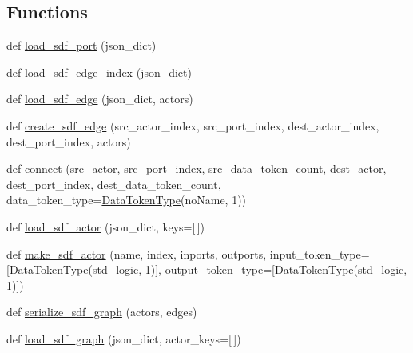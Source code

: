 \subsection*{Functions}
\begin{DoxyCompactItemize}
\item 
def \hyperlink{namespacesylva_1_1base_1_1sdf_a72bbd0e1cd0a666269ac3f17427954b8}{load\+\_\+sdf\+\_\+port} (json\+\_\+dict)
\item 
def \hyperlink{namespacesylva_1_1base_1_1sdf_a67886f481ab9be68797400241d754f64}{load\+\_\+sdf\+\_\+edge\+\_\+index} (json\+\_\+dict)
\item 
def \hyperlink{namespacesylva_1_1base_1_1sdf_acd1ba464e47476a5205de3e3856fbb83}{load\+\_\+sdf\+\_\+edge} (json\+\_\+dict, actors)
\item 
def \hyperlink{namespacesylva_1_1base_1_1sdf_a7c688b99c9dcb365aa7598c79f038839}{create\+\_\+sdf\+\_\+edge} (src\+\_\+actor\+\_\+index, src\+\_\+port\+\_\+index, dest\+\_\+actor\+\_\+index, dest\+\_\+port\+\_\+index, actors)
\item 
def \hyperlink{namespacesylva_1_1base_1_1sdf_a0c4055dfc61c95b2f23e5a5dba353302}{connect} (src\+\_\+actor, src\+\_\+port\+\_\+index, src\+\_\+data\+\_\+token\+\_\+count, dest\+\_\+actor, dest\+\_\+port\+\_\+index, dest\+\_\+data\+\_\+token\+\_\+count, data\+\_\+token\+\_\+type=\hyperlink{classsylva_1_1base_1_1sdf_1_1_data_token_type}{Data\+Token\+Type}(\textquotesingle{}no\+Name\textquotesingle{}, 1))
\item 
def \hyperlink{namespacesylva_1_1base_1_1sdf_a14b2bfbb0fd81d1e114b670f13f718f1}{load\+\_\+sdf\+\_\+actor} (json\+\_\+dict, keys=\mbox{[}$\,$\mbox{]})
\item 
def \hyperlink{namespacesylva_1_1base_1_1sdf_a34a38a5853d86a6e49aba53f9040462d}{make\+\_\+sdf\+\_\+actor} (name, index, inports, outports, input\+\_\+token\+\_\+type=\mbox{[}\hyperlink{classsylva_1_1base_1_1sdf_1_1_data_token_type}{Data\+Token\+Type}(\textquotesingle{}std\+\_\+logic\textquotesingle{}, 1)\mbox{]}, output\+\_\+token\+\_\+type=\mbox{[}\hyperlink{classsylva_1_1base_1_1sdf_1_1_data_token_type}{Data\+Token\+Type}(\textquotesingle{}std\+\_\+logic\textquotesingle{}, 1)\mbox{]})
\item 
def \hyperlink{namespacesylva_1_1base_1_1sdf_af3757c4b0997b952e06efde4a2da8321}{serialize\+\_\+sdf\+\_\+graph} (actors, edges)
\item 
def \hyperlink{namespacesylva_1_1base_1_1sdf_a0bdfa7a81bf9648662631113a609062d}{load\+\_\+sdf\+\_\+graph} (json\+\_\+dict, actor\+\_\+keys=\mbox{[}$\,$\mbox{]})

\end{DoxyCompactItemize}
